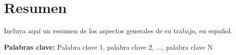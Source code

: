 \chapter*{Resumen}
Incluya aquí un resumen de los aspectos generales de su trabajo, en español.

\vspace{.5cm}

\textbf{Palabras clave:} Palabra clave 1, palabra clave 2, ..., palabra clave N